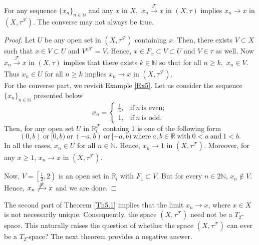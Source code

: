 \documentclass[11pt]{amsart}
\begin{document}
\begin{theorem}\label{Th5.1}
   For any sequence $\{x_n\}_{n\in \mathbb{N}}$ and any $x$ in $X,$ $x_n\xrightarrow[]{\mathscr{F}} x$ in $(X,\tau)$ implies $x_n\xrightarrow[]{} x$ in $\left(X,\tau^\mathscr{F}\right)$.  The converse may not always be true.
\end{theorem}

\begin{proof}
    Let $U$ be any open set in $\left(X,\tau^\mathscr{F}\right)$ containing $x.$ Then, there exists $V\subset X$ such that $x\in V\subset U$ and $V^{o\mathscr{F}}=V$. Hence, $x\in F_x\subset V\subset U$ and $V\in \tau$ as well. Now $x_n\xrightarrow[]{\mathscr{F}} x$ in $(X,\tau)$ implies that there exists $k\in\mathbb{N}$ so that for all $n\ge k,$ $x_n\in V.$ Thus $x_n\in U$ for all $n\ge k$ implies $x_n\xrightarrow[]{} x$ in $\left(X,\tau^\mathscr{F}\right).$\\

   For the converse part, we revisit Example \ref{Ex5}. Let us consider the sequence $\{x_n\}_{n\in \mathbb{N}}$ presented below $$x_n=\begin{cases}\frac{1}{4},&\text{if}~n~\text{is even};\\
     1, &\text{if}~n~\text{is odd}.
     \end{cases}$$
     Then, for any open set $U$ in $\mathbb{R}^\mathscr{F}_l$ containg $1$ is one of the following form $$(0,b)~\text{or}~[0,b)~\text{or}~(-a,b)~\text{or}~[-a,b)~\text{where}~a,b\in \mathbb{R}~\text{with}~0<a~\text{and}~1<b.$$
     In all the cases, $x_n\in U$ for all $n\in \mathbb{N}.$ Hence, $x_n\xrightarrow[]{} 1$ in $\left(X,\tau^\mathscr{F}\right).$ Moreover, for any $x\ge 1$, $x_n\xrightarrow[]{} x$ in $\left(X,\tau^\mathscr{F}\right).$ %

     Now, $V=\left[\frac{1}{2},2\right)$ is an open set in $\mathbb{R}_l$ with $F_1\subset V$. But for every $n\in 2\mathbb{N}$, $x_n\notin V$. Hence, $x_n\not\xrightarrow[]{\mathscr{F}} x$ and we are done.
\end{proof}


The second part of Theorem \ref{Th5.1} implies that the limit $x_n\to x$, where $x\in X$ is not necessarily unique.  Consequently, the space $\left(X,\tau^\mathscr{F}\right)$ need not be a $T_2$-space. This naturally raises the question of whether the space $(X,\tau^\mathscr{F})$ can ever be a $T_2$-space? The next theorem provides a negative answer.
\end{document}
